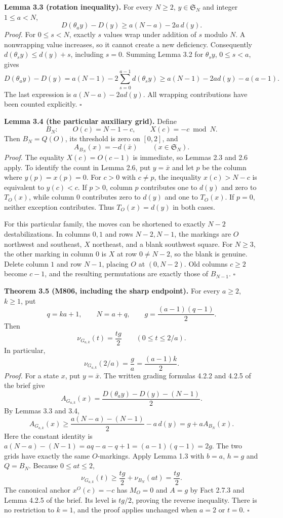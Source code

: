 \documentclass[11pt,a4paper]{article}
\begin{document}
\textbf{Lemma 3.3 (rotation inequality).}
For every $N\ge2$, $y\in\mathfrak S_N$ and integer $1\le a<N$,
\[
D(\theta_a y)-D(y)\ge a(N-a)-2a\,d(y).
\]
\textit{Proof.}
For $0\le s<N$, exactly $s$ values wrap under addition of $s$ modulo $N$.
A nonwrapping value increases, so it cannot create a new deficiency.
Consequently $d(\theta_s y)\le d(y)+s$, including $s=0$.
Summing Lemma 3.2 for $\theta_s y$, $0\le s<a$, gives
\[
D(\theta_a y)-D(y)
=a(N-1)-2\sum_{s=0}^{a-1}d(\theta_s y)
\ge a(N-1)-2ad(y)-a(a-1).
\]
The last expression is $a(N-a)-2ad(y)$. All wrapping contributions
have been counted explicitly. $\square$

\textbf{Lemma 3.4 (the particular auxiliary grid).}
Define
\[
B_N:\qquad O(c)=N-1-c,\qquad X(c)=-c\bmod N.
\]
Then $B_N=Q(O)$, its threshold is zero on $[0,2]$, and
\[
A_{B_N}(x)=-d(\bar x)\qquad(x\in\mathfrak S_N).
\]
\textit{Proof.}
The equality $X(c)=O(c-1)$ is immediate, so Lemmas 2.3 and 2.6 apply.
To identify the count in Lemma 2.6, put $y=\bar x$ and let $p$ be the
column where $y(p)=x(p)=0$. For $c>0$ with $c\ne p$, the inequality
$x(c)>N-c$ is equivalent to $y(c)<c$. If $p>0$, column $p$ contributes
one to $d(y)$ and zero to $T_O(x)$, while column $0$ contributes zero
to $d(y)$ and one to $T_O(x)$. If $p=0$, neither exception contributes.
Thus $T_O(x)=d(y)$ in both cases.

For this particular family, the moves can be shortened to exactly
$N-2$ destabilizations. In columns $0,1$ and rows $N-2,N-1$, the
markings are $O$ northwest and southeast, $X$ northeast, and a blank
southwest square. For $N\ge3$, the other marking in column $0$ is
$X$ at row $0\ne N-2$, so the blank is genuine. Delete column $1$
and row $N-1$, placing $O$ at $(0,N-2)$. Old columns $c\ge2$ become
$c-1$, and the resulting permutations are exactly those of $B_{N-1}$.
$\square$

\textbf{Theorem 3.5 (M806, including the sharp endpoint).}
For every $a\ge2$, $k\ge1$, put
\[
q=ka+1,\qquad N=a+q,\qquad g=\frac{(a-1)(q-1)}{2}.
\]
Then
\[
\nu_{G_{a,k}}(t)=\frac{tg}{2}\qquad(0\le t\le2/a).
\]
In particular,
\[
\nu_{G_{a,k}}(2/a)=\frac{g}{a}=\frac{(a-1)k}{2}.
\]
\textit{Proof.}
For a state $x$, put $y=\bar x$. The written grading formulas
4.2.2 and 4.2.5 of the brief give
\[
A_{G_{a,k}}(x)=\frac{D(\theta_a y)-D(y)-(N-1)}{2}.
\]
By Lemmas 3.3 and 3.4,
\[
A_{G_{a,k}}(x)\ge
\frac{a(N-a)-(N-1)}{2}-a\,d(y)
=g+aA_{B_N}(x).
\]
Here the constant identity is
$a(N-a)-(N-1)=aq-a-q+1=(a-1)(q-1)=2g$.
The two grids have exactly the same $O$-markings. Apply Lemma 1.3
with $b=a$, $h=g$ and $Q=B_N$. Because $0\le at\le2$,
\[
\nu_{G_{a,k}}(t)\ge\frac{tg}{2}+\nu_{B_N}(at)=\frac{tg}{2}.
\]
The canonical anchor $x^O(c)=-c$ has $M_O=0$ and $A=g$ by Fact 2.7.3
and Lemma 4.2.5 of the brief. Its level is $tg/2$, proving the reverse
inequality. There is no restriction to $k=1$, and the proof applies
unchanged when $a=2$ or $t=0$. $\square$
\end{document}
